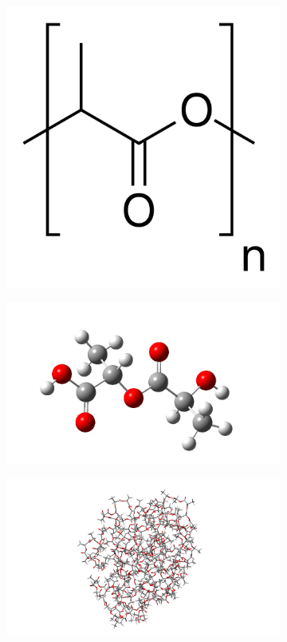 \vspace{-0.5cm}
\begin{figure}[htb]
	\begin{subfigure}{0.3\textwidth}
		\centering
		\includegraphics[width=0.65\linewidth]{img/pla_vzorec.png} 
	\end{subfigure}
	\begin{subfigure}{0.3\textwidth}
		\includegraphics[width=1.2\linewidth]{img/pla_1d.png}
	\end{subfigure}
	\begin{subfigure}{0.33\textwidth}
		\includegraphics[width=1.4\linewidth]{img/pla_100g_tube.png}

\end{subfigure}
\end{figure}

